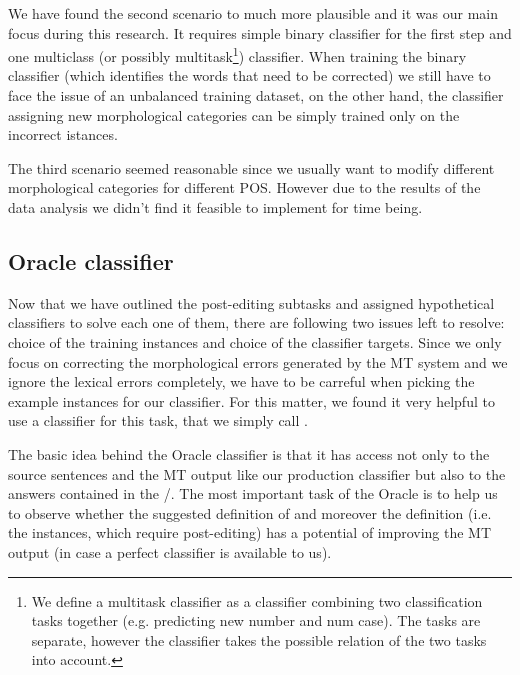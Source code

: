 We have found the second scenario to much more plausible and it was our main focus during this research.
It requires simple binary classifier for the first step and one multiclass (or possibly multitask\footnote{We
define a multitask classifier as a classifier combining two classification tasks together (e.g. predicting new number and num case).
The tasks are separate, however the classifier takes the possible relation of the two tasks into account.}) classifier.
When training the binary classifier (which identifies the words that need to be corrected) we still have to face
the issue of an unbalanced training dataset, on the other hand, the classifier assigning new morphological categories
can be simply trained only on the incorrect istances.

The third scenario seemed reasonable since we usually want to modify different morphological categories for different POS.
However due to the results of the data analysis we didn't find it feasible to implement for time being.

\subsection{Oracle classifier}

Now that we have outlined the post-editing subtasks and assigned hypothetical classifiers 
to solve each one of them, there are following two issues left to resolve: choice of the
training instances and choice of the classifier targets. Since we only focus on correcting the morphological
errors generated by the MT system and we ignore the lexical errors completely, we have to be carreful
when picking the example instances for our classifier. For this matter, we found it very helpful to
use a  classifier for this task, that we simply call .

The basic idea behind the Oracle classifier is that it has access not only to the
source sentences and the MT output like our production classifier but also to the  answers
contained in the /. The most important
task of the Oracle is to help us to observe whether the suggested definition of  and
moreover the definition  (i.e. the instances, which require post-editing)
has a potential of improving the MT output (in case a perfect classifier is available to us).

